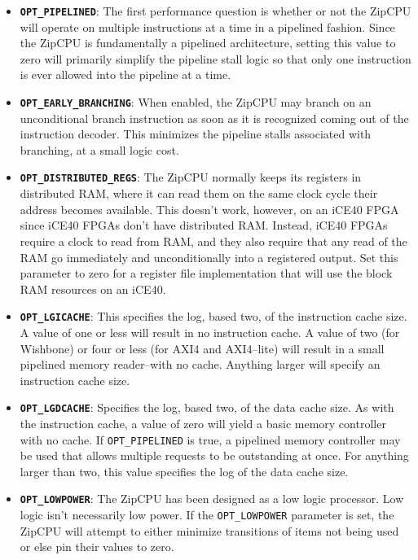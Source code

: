 \documentclass{gqtekspec}
\begin{document}
\begin{itemize}
\item {\bf\tt OPT\_PIPELINED}:  The first performance question is whether or not
	the ZipCPU will operate on multiple instructions at a time in a
	pipelined fashion.  Since the ZipCPU is fundamentally a pipelined
	architecture, setting this value to zero will primarily simplify the
	pipeline stall logic so that only one instruction is ever allowed into
	the pipeline at a time.

\item {\bf\tt OPT\_EARLY\_BRANCHING}:  When enabled, the ZipCPU may branch
	on an unconditional branch instruction as soon as it is recognized
	coming out of the instruction decoder.  This minimizes the pipeline
	stalls associated with branching, at a small logic cost.

\item {\bf\tt OPT\_DISTRIBUTED\_REGS}:  The ZipCPU normally keeps its registers
	in distributed RAM, where it can read them on the same clock cycle
	their address becomes available.  This doesn't work, however, on an
	iCE40 FPGA since iCE40 FPGAs don't have distributed RAM.  Instead,
	iCE40 FPGAs require a clock to read from RAM, and they also require
	that any read of the RAM go immediately and unconditionally into a
	registered output.  Set this parameter to zero for a register file
	implementation that will use the block RAM resources on an iCE40.

\item {\bf\tt OPT\_LGICACHE}: This specifies the log, based two, of the
	instruction cache size.  A value of one or less will result in no
	instruction cache.  A value of two (for Wishbone) or four or less
	(for AXI4 and AXI4--lite) will result in a small pipelined memory
	reader--with no cache.  Anything larger will specify an instruction
	cache size.

\item {\bf\tt OPT\_LGDCACHE}: Specifies the log, based two, of the data cache
	size.  As with the instruction cache, a value of zero will yield
	a basic memory controller with no cache.  If {\tt OPT\_PIPELINED} is
	true, a pipelined memory controller may be used that allows multiple
	requests to be outstanding at once.  For anything larger than two,
	this value specifies the log of the data cache size.

\item {\bf\tt OPT\_LOWPOWER}: The ZipCPU has been designed as a low logic
	processor.  Low logic isn't necessarily low power.  If the
	{\tt OPT\_LOWPOWER} parameter is set, the ZipCPU will attempt to either
	minimize transitions of items not being used or else pin their values
	to zero.
\end{itemize}
\end{document}
